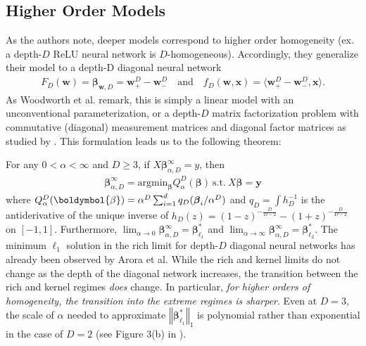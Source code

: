 \documentclass{article}
\newenvironment{manualtheorem}[1]{%
  \renewcommand\themanualtheoreminner{#1}%
  \manualtheoreminner
}{\endmanualtheoreminner}
\begin{document}
\subsection{Higher Order Models}
As the authors note, deeper models correspond to higher order homogeneity (ex. a depth-$D$ ReLU neural network is $D$-homogeneous). Accordingly, they generalize their model to a depth-D diagonal neural network
\begin{align*}
    F_D(\boldsymbol{w}) = \boldsymbol{\beta}_{\boldsymbol{w}, D} = \boldsymbol{w}_+^D - \boldsymbol{w}_-^D \quad \text{and} \quad f_D(\boldsymbol{w}, \boldsymbol{x})  = \langle \boldsymbol{w}_+^D - \boldsymbol{w}_-^D, \boldsymbol{x} \rangle.
\end{align*}
As Woodworth et al. remark, this is simply a linear model with an unconventional parameterization, or a depth-$D$ matrix factorization problem with commutative (diagonal) measurement matrices and diagonal factor matrices as studied by \cite{arora2019implicit}. This formulation leads us to the following theorem:
\begin{manualtheorem}{3}
For any $0 < \alpha < \infty$ and $D \geq 3$, if $X \boldsymbol{\beta}_{\alpha, D}^{\infty} = y$, then
\begin{align*}
    \boldsymbol{\beta}_{\alpha, D}^{\infty} = \text{argmin}_{\boldsymbol{\beta}} Q_{\alpha}^D(\boldsymbol{\beta}) \ \text{s.t.} \ X \boldsymbol{\beta} = \boldsymbol{y}
\end{align*}
where $Q_{\alpha}^D(\boldymbol{\beta}) = \alpha^D \sum_{i=1}^d q_D(\boldsymbol{\beta}_i/\alpha^D)$ and $q_D = \int h_D^{-1}$ is the antiderivative of the unique inverse of $h_D(z) = (1-z)^{-\frac{D}{D-2}} - (1+z)^{-\frac{D}{D-2}}$ on $[-1, 1]$. Furthermore, $\lim_{\alpha \rightarrow 0} \boldsymbol{\beta}_{\alpha, D}^{\infty} = \boldsymbol{\beta}_{\ell_1}^*$ and $\lim_{\alpha \rightarrow \infty} \boldsymbol{\beta}_{\alpha, D}^{\infty} = \boldsymbol{\beta}_{\ell_2}^*$.
\end{manualtheorem}
The minimum $\ell_1$ solution in the rich limit for depth-$D$ diagonal neural networks has already been observed by Arora et al. While the rich and kernel limits do not change as the depth of the diagonal network increases, the transition between the rich and kernel regimes \textit{does} change. In particular, \textit{for higher orders of homogeneity, the transition into the extreme regimes is sharper}. Even at $D=3$, the scale of $\alpha$ needed to approximate $\left\Vert \boldsymbol{\beta}_{\ell_1}^* \right\Vert_1$ is polynomial rather than exponential in the case of $D=2$ (see Figure 3(b) in \cite{woodworth2020kernel}). 
\end{document}
